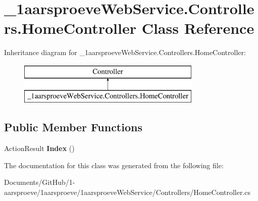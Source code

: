 \hypertarget{class__1aarsproeve_web_service_1_1_controllers_1_1_home_controller}{}\section{\+\_\+1aarsproeve\+Web\+Service.\+Controllers.\+Home\+Controller Class Reference}
\label{class__1aarsproeve_web_service_1_1_controllers_1_1_home_controller}
Inheritance diagram for \+\_\+1aarsproeve\+Web\+Service.\+Controllers.\+Home\+Controller\+:\begin{figure}[H]
\begin{center}
\leavevmode
\includegraphics[height=2.000000cm]{class__1aarsproeve_web_service_1_1_controllers_1_1_home_controller}
\end{center}
\end{figure}
\subsection*{Public Member Functions}
\begin{DoxyCompactItemize}
\item 
\hypertarget{class__1aarsproeve_web_service_1_1_controllers_1_1_home_controller_afeaf8faefb53b2651fbdcbd4c743496c}{}Action\+Result {\bfseries Index} ()\label{class__1aarsproeve_web_service_1_1_controllers_1_1_home_controller_afeaf8faefb53b2651fbdcbd4c743496c}

\end{DoxyCompactItemize}


The documentation for this class was generated from the following file\+:\begin{DoxyCompactItemize}
\item 
Documents/\+Git\+Hub/1-\/aarsproeve/1aarsproeve/1aarsproeve\+Web\+Service/\+Controllers/Home\+Controller.\+cs\end{DoxyCompactItemize}
